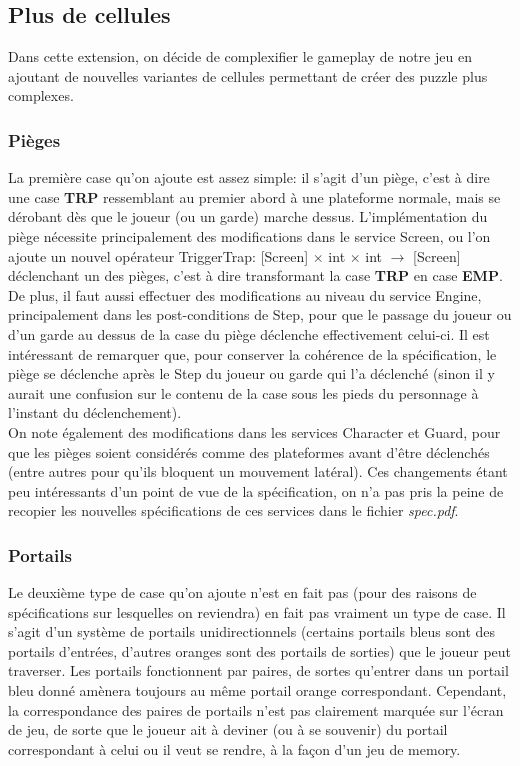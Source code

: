 \documentclass{article}
\begin{document}
\subsection{Plus de cellules}
Dans cette extension, on décide de complexifier le gameplay de notre jeu en ajoutant de nouvelles variantes de cellules permettant de créer des puzzle plus complexes.

\subsubsection{Pièges}
La première case qu'on ajoute est assez simple: il s'agit d'un piège, c'est à dire une case \textbf{TRP} ressemblant au premier abord à une plateforme normale, mais se dérobant dès que le joueur (ou un garde) marche dessus.
L'implémentation du piège nécessite principalement des modifications dans le service \textrm{Screen}, ou l'on ajoute un nouvel opérateur \textrm{TriggerTrap: [Screen] $\times$ int $\times$ int $\rightarrow$ [Screen]} déclenchant un des pièges, c'est à dire transformant la case \textbf{TRP} en case \textbf{EMP}. De plus, il faut aussi effectuer des modifications au niveau du service \textrm{Engine}, principalement dans les post-conditions de \textrm{Step}, pour que le passage du joueur ou d'un garde au dessus de la case du piège déclenche effectivement celui-ci. Il est intéressant de remarquer que, pour conserver la cohérence de la spécification, le piège se déclenche après le \textrm{Step} du joueur ou garde qui l'a déclenché (sinon il y aurait une confusion sur le contenu de la case sous les pieds du personnage à l'instant du déclenchement).\\

On note également des modifications dans les services \textrm{Character} et \textrm{Guard}, pour que les pièges soient considérés comme des plateformes avant d'être déclenchés (entre autres pour qu'ils bloquent un mouvement latéral). Ces changements étant peu intéressants d'un point de vue de la spécification, on n'a pas pris la peine de recopier les nouvelles spécifications de ces services dans le fichier \textit{spec.pdf}.

\subsubsection{Portails}
Le deuxième type de case qu'on ajoute n'est en fait pas (pour des raisons de spécifications sur lesquelles on reviendra) en fait pas vraiment un type de case. Il s'agit d'un système de portails unidirectionnels (certains portails bleus sont des portails d'entrées, d'autres oranges sont des portails de sorties) que le joueur peut traverser. Les portails fonctionnent par paires, de sortes qu'entrer dans un portail bleu donné amènera toujours au même portail orange correspondant. Cependant, la correspondance des paires de portails n'est pas clairement marquée sur l'écran de jeu, de sorte que le joueur ait à deviner (ou à se souvenir) du portail correspondant à celui ou il veut se rendre, à la façon d'un jeu de memory.\\
\end{document}
